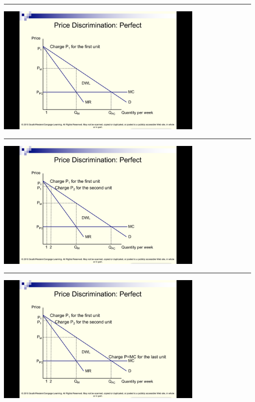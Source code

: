 \documentclass[]{article}
\begin{document}
\begin{center}\rule{0.5\linewidth}{\linethickness}\end{center}

\includegraphics[height=2.5in]{picsfigs/ppd3.png}

\begin{center}\rule{0.5\linewidth}{\linethickness}\end{center}

\includegraphics[height=2.5in]{picsfigs/ppd4.png}

\begin{center}\rule{0.5\linewidth}{\linethickness}\end{center}

\includegraphics[height=2.5in]{picsfigs/ppd5.png}
\end{document}
